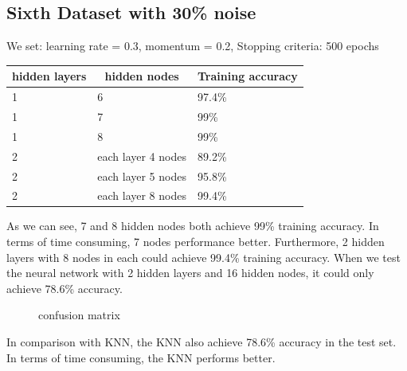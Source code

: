 \documentclass[11pt, a4paper, oneside, openright]{article}
\begin{document}
\subsection{Sixth Dataset with 30\% noise}
We set:  learning rate = 0.3, momentum = 0.2, Stopping criteria: 500 epochs
\begin{table}[H]
\centering
\begin{tabular}{|l|l|l|}
\hline
\multicolumn{1}{|c|}{\textbf{hidden layers}} & \multicolumn{1}{c|}{\textbf{hidden nodes}} 
& \multicolumn{1}{c|}{\textbf{Training accuracy}}\\
\hline
1     &6 &97.4\%                                    \\
\hline
1    &7 &99\%                                  \\
\hline
1   &8 &99\%                                             \\
\hline
2 &each layer 4 nodes  &89.2\%                                            \\
\hline
2  &each layer 5 nodes &95.8\%                                              \\
\hline
2  &each layer 8 nodes &99.4\%                                              \\
\hline
\end{tabular}
\end{table}

As we can see, 7 and 8 hidden nodes both achieve 99\% training accuracy. In terms of time consuming, 7 nodes performance better. Furthermore, 2 hidden layers with 8 nodes in each could achieve 99.4\% training accuracy.
When we test the neural network with 2 hidden layers and 16 hidden nodes, it could  only achieve 78.6\% accuracy.
  \begin{figure}[!ht]
  \centerline{}
  \caption{confusion matrix}
  \label{fig:confusion_3}
  \end{figure}
In comparison with KNN, the KNN also achieve 78.6\% accuracy in the test set. In terms of time consuming, the KNN performs better.
\end{document}
